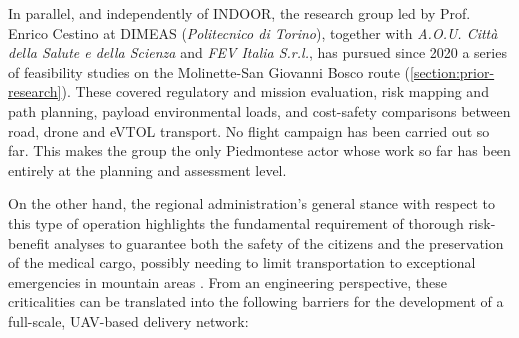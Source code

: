 In parallel, and independently of INDOOR, the research group led by Prof. Enrico Cestino at DIMEAS (\textit{Politecnico di Torino}), together with \textit{A.O.U. Città della Salute e della Scienza} and \textit{FEV Italia S.r.l.}, has pursued since 2020 a series of feasibility studies on the Molinette-San Giovanni Bosco route (\cref{section:prior-research}). These covered regulatory and mission evaluation, risk mapping and path planning, payload environmental loads, and cost-safety comparisons between road, drone and eVTOL transport. No flight campaign has been carried out so far. This makes the group the only Piedmontese actor whose work so far has been entirely at the planning and assessment level.

On the other hand, the regional administration's general stance with respect to this type of operation highlights the fundamental requirement of thorough risk-benefit analyses to guarantee both the safety of the citizens and the preservation of the medical cargo, possibly needing to limit transportation to exceptional emergencies in mountain areas \cite{cr_piemonte}. From an engineering perspective, these criticalities can be translated into the following barriers for the development of a full-scale, UAV-based delivery network:

